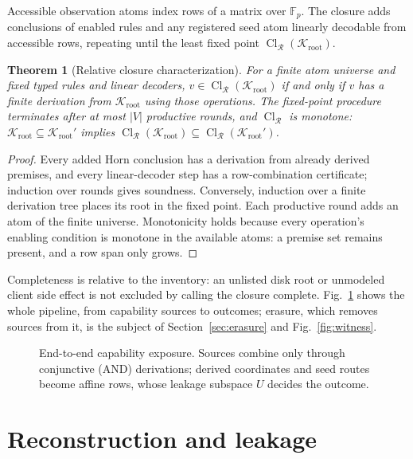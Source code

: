 \documentclass[pdflatex,sn-mathphys-num]{sn-jnl}%
\theoremstyle{plain}
\newtheorem{theorem}{Theorem}
\theoremstyle{definition}
\newcommand{\Cl}{\operatorname{Cl}}
\newcommand{\F}{\mathbb{F}}
\begin{document}
Accessible observation atoms index rows of a matrix over $\F_p$. The closure adds conclusions of enabled rules and any registered seed atom linearly decodable from accessible rows, repeating until the least fixed point $\Cl_{\mathcal R}(\mathcal K_{\mathrm{root}})$.

\begin{theorem}[Relative closure characterization]\label{thm:closure}
For a finite atom universe and fixed typed rules and linear decoders, $v\in\Cl_{\mathcal R}(\mathcal K_{\mathrm{root}})$ if and only if $v$ has a finite derivation from $\mathcal K_{\mathrm{root}}$ using those operations. The fixed-point procedure terminates after at most $|V|$ productive rounds, and $\Cl_{\mathcal R}$ is monotone: $\mathcal K_{\mathrm{root}}\subseteq \mathcal K_{\mathrm{root}}'$ implies $\Cl_{\mathcal R}(\mathcal K_{\mathrm{root}})\subseteq\Cl_{\mathcal R}(\mathcal K_{\mathrm{root}}')$.
\end{theorem}
\begin{proof}
Every added Horn conclusion has a derivation from already derived premises, and every linear-decoder step has a row-combination certificate; induction over rounds gives soundness. Conversely, induction over a finite derivation tree places its root in the fixed point. Each productive round adds an atom of the finite universe. Monotonicity holds because every operation's enabling condition is monotone in the available atoms: a premise set remains present, and a row span only grows.
\end{proof}

Completeness is relative to the inventory: an unlisted disk root or unmodeled client side effect is not excluded by calling the closure complete. Fig.~\ref{fig:capabilities} shows the whole pipeline, from capability sources to outcomes; erasure, which removes sources from it, is the subject of Section~\ref{sec:erasure} and Fig.~\ref{fig:witness}.

\begin{figure}[t]
\centering
\figbox{}
\caption{End-to-end capability exposure. Sources combine only through conjunctive (AND) derivations; derived coordinates and seed routes become affine rows, whose leakage subspace $U$ decides the outcome.}\label{fig:capabilities}
\end{figure}


\section{Reconstruction and leakage}\label{sec:leakage}
\end{document}
